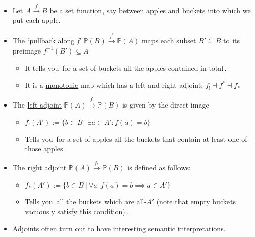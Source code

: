 
\begin{itemize}
    \item Let $A \xrightarrow{f} B$ be a set function, say between apples and buckets into which we put each apple.
    \item The `\href{doc/1 math/Seven Sketches in Compositionality/Chapter 1: Generative Effects/4 Monotone maps/4 Pullback along monotone}{pullback} along \emph{f}' $\mathbb{P}(B) \xrightarrow{f^*} \mathbb{P}(A)$ maps each subset $B' \subseteq B$ to its preimage $f^{-1}(B') \subseteq A$
          \begin{itemize}
            \item It tells you \,for a set of buckets all the apples contained in total\,.
            \item It is a \href{doc/1 math/Seven Sketches in Compositionality/Chapter 1: Generative Effects/4 Monotone maps/1 Monotone map}{monotonic} map which has a left and right adjoint: $f_! \dashv f^* \dashv f_*$
          \end{itemize}
    \item The \href{doc/1 math/Seven Sketches in Compositionality/Chapter 1: Generative Effects/6 Galois connections/1 Definition and examples/Galois connection}{left adjoint} $\mathbb{P}(A)\xrightarrow{f_!}\mathbb{P}(B)$ is given by the direct image
          \begin{itemize}
            \item $f_!(A') := \{b \in B\ |\ \exists a \in A': f(a)=b\}$
            \item Tells you \,for a set of apples all the buckets that contain at least one of those apples\,.
          \end{itemize}
    \item The \href{doc/1 math/Seven Sketches in Compositionality/Chapter 1: Generative Effects/6 Galois connections/1 Definition and examples/Galois connection}{right adjoint} $\mathbb{P}(A) \xrightarrow{f_*} \mathbb{P}(B)$ is defined as follows:
          \begin{itemize}
            \item  $f_*(A') := \{b \in B\ |\ \forall a: f(a)=b \implies a \in A'\}$
            \item Tells you \,all the buckets which are all-$A\prime$ (note that empty buckets vacuously satisfy this condition)\,.
          \end{itemize}
    \item Adjoints often turn out to have interesting semantic interpretations.
  \end{itemize}